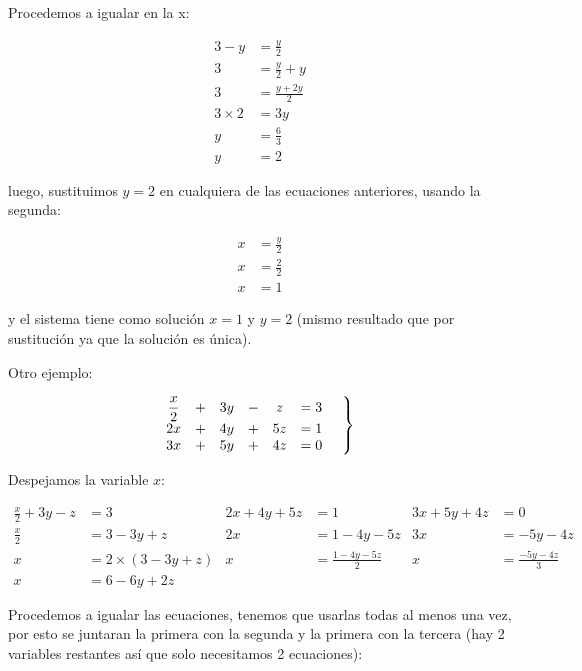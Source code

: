 \documentclass[12pt]{article}
\begin{document}
    Procedemos a igualar en la x:

    \begin{align*}
        3-y &= 	\frac{y}{2} 	\\
        3 &= \frac{y}{2}+y \\
        3 &= \frac{y+2y}{2} \\
        3\times2 &= 3y \\
        y &= \frac{6}{3} \\
        y&=2
    \end{align*}

    luego, sustituimos $y=2$ en cualquiera de las ecuaciones anteriores, usando
    la segunda:

    \begin{align*}
        x&= \frac{y}{2}  		\\
        x&= \frac{2}{2} \\
        x&=1
    \end{align*}

    y el sistema tiene como solución $ x=1 $ y $ y=2 $ (mismo resultado que por
    sustitución ya que la   solución es única).

    Otro ejemplo:

   \begin{equation*}
        \left.
        \begin{matrix}
            \displaystyle\frac{x}{2} &+& 3y &-& z &= 3 \\
            2x &+& 4y &+&5z &= 1\\
            3x &+& 5y &+& 4z &=0
        \end{matrix}
        \hspace*{0.5cm}\right\rbrace
    \end{equation*}

    Despejamos la variable $x$:

    \begin{align*}
        \displaystyle\frac{x}{2} +3y-z &=3   & 2x+4y+5z &= 1             & 3x+5y+4z &= 0 \\
        \displaystyle\frac{x}{2} &= 3-3y+z   & 2x &= 1-4y-5z             & 3x &= -5y-4z  \\
        x&= 2\times(3-3y+z)     & x &= \frac{1-4y-5z}{2}    & x &= \frac{-5y-4z}{3} \\
        x&= 6-6y+2z
    \end{align*}


    Procedemos a igualar las ecuaciones, tenemos que usarlas todas al menos una
    vez, por esto se juntaran la primera con la segunda y la primera con la tercera
    (hay 2 variables restantes así que solo necesitamos 2 ecuaciones):
\end{document}
